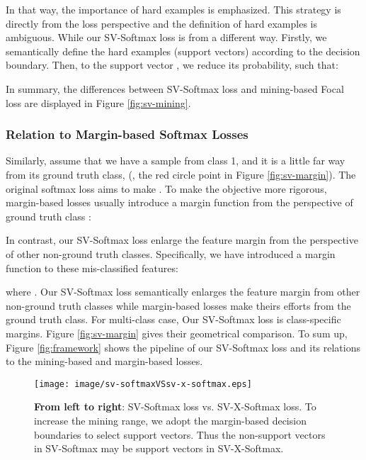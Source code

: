 \documentclass[10pt,twocolumn,letterpaper]{article}
\begin{document}
In that way, the importance of hard examples is emphasized. This strategy is directly from the loss perspective and the definition of hard examples is ambiguous. While our SV-Softmax loss is from a different way. Firstly, we semantically define the hard examples (support vectors) according to the decision boundary. Then, to the support vector , we reduce its probability, such that:

In summary, the differences between SV-Softmax loss and mining-based Focal loss \cite{Focal} are displayed in Figure \ref{fig:sv-mining}.







\subsubsection{Relation to Margin-based Softmax Losses}
Similarly, assume that we have a sample  from class 1, and it is a little far way from its ground truth class, (, the red circle point in Figure \ref{fig:sv-margin}). The original softmax loss aims to make . To make the objective more rigorous, margin-based losses usually introduce a margin function  from the perspective of ground truth class \cite{SphereFace,AM-Softmax,Arc-Softmax}:

In contrast, our SV-Softmax loss enlarge the feature margin from the perspective of other non-ground truth classes. Specifically, we have introduced a margin function  to these mis-classified features:

where . Our SV-Softmax loss semantically enlarges the feature margin from other non-ground truth classes while margin-based losses make theirs efforts from the ground truth class. For multi-class case, Our SV-Softmax loss is class-specific margins. Figure \ref{fig:sv-margin} gives their geometrical comparison. To sum up, Figure \ref{fig:framework} shows the pipeline of our SV-Softmax loss and its relations to the mining-based and margin-based losses.

\begin{figure}[t]
\begin{center}
\texttt{[image: image/sv-softmaxVSsv-x-softmax.eps]}
\end{center}
   \caption{\textbf{From left to right}: SV-Softmax loss vs. SV-X-Softmax loss. To increase the mining range, we adopt the margin-based decision boundaries to select support vectors. Thus the non-support vectors in SV-Softmax may be support vectors in SV-X-Softmax.}
\label{fig:sv-svx}
\end{figure}
\end{document}
